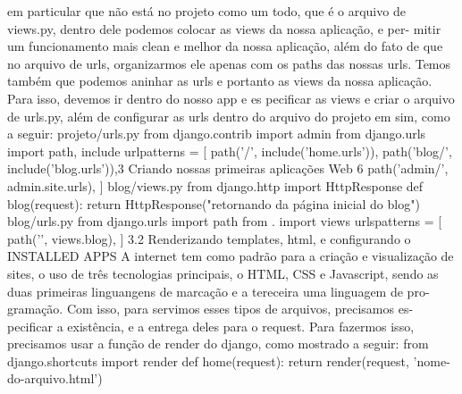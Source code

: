 \documentclass{paper}
\begin{document}
em particular que não está no projeto como um todo, que é o arquivo de
views.py, dentro dele podemos colocar as views da nossa aplicação, e per-
mitir um funcionamento mais clean e melhor da nossa aplicação, além do
fato de que no arquivo de urls, organizarmos ele apenas com os paths das
nossas urls.
Temos também que podemos aninhar as urls e portanto as views da nossa
aplicação. Para isso, devemos ir dentro do nosso app e es pecificar as views
e criar o arquivo de urls.py, além de configurar as urls dentro do arquivo
do projeto em sim, como a seguir:
projeto/urls.py
from django.contrib import admin
from django.urls import path, include
urlpatterns = [
path(’/’, include(’home.urls’)),
path(’blog/’, include(’blog.urls’)),3 Criando nossas primeiras aplicações Web
6
path(’admin/’, admin.site.urls),
]
blog/views.py
from django.http import HttpResponse
def blog(request):
return HttpResponse("retornando da página inicial do blog")
blog/urls.py
from django.urls import path
from . import views
urlspatterns = [
path(’’, views.blog),
]
3.2
Renderizando templates, html, e configurando o
INSTALLED APPS
A internet tem como padrão para a criação e visualização de sites, o uso
de três tecnologias principais, o HTML, CSS e Javascript, sendo as duas
primeiras linguangens de marcação e a tereceira uma linguagem de pro-
gramação. Com isso, para servimos esses tipos de arquivos, precisamos es-
pecificar a existência, e a entrega deles para o request. Para fazermos isso,
precisamos usar a função de render do django, como mostrado a seguir:
from django.shortcuts import render
def home(request):
return render(request,
’nome-do-arquivo.html’)
\end{document}
